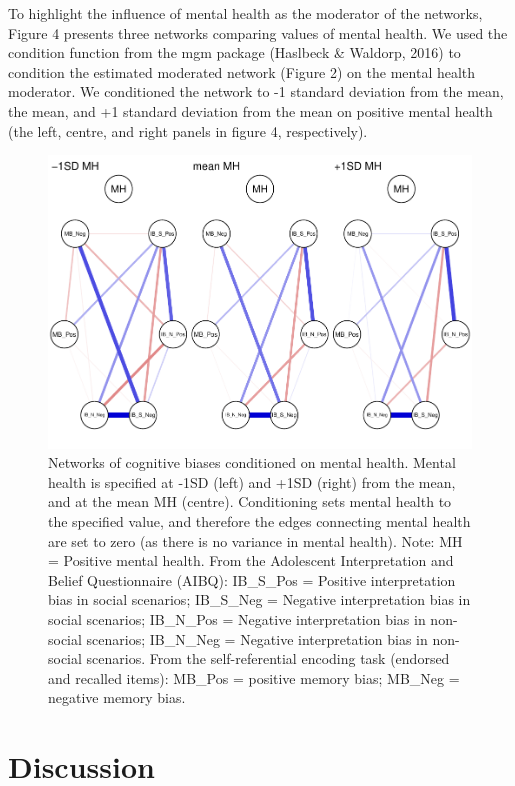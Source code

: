 \documentclass[man,floatsintext]{apa6}
\begin{document}
To highlight the influence of mental health as the moderator of the networks, Figure 4 presents three networks comparing values of mental health. We used the condition function from the mgm package (Haslbeck \& Waldorp, 2016) to condition the estimated moderated network (Figure 2) on the mental health moderator. We conditioned the network to -1 standard deviation from the mean, the mean, and +1 standard deviation from the mean on positive mental health (the left, centre, and right panels in figure 4, respectively).

\begin{figure}
\centering
\includegraphics{script_files/figure-latex/unnamed-chunk-5-1.pdf}
\caption{\label{fig:unnamed-chunk-5}Networks of cognitive biases conditioned on mental health. Mental health is specified at -1SD (left) and +1SD (right) from the mean, and at the mean MH (centre). Conditioning sets mental health to the specified value, and therefore the edges connecting mental health are set to zero (as there is no variance in mental health).
Note: MH = Positive mental health. From the Adolescent Interpretation and Belief Questionnaire (AIBQ): IB\_S\_Pos = Positive interpretation bias in social scenarios; IB\_S\_Neg = Negative interpretation bias in social scenarios; IB\_N\_Pos = Negative interpretation bias in non-social scenarios; IB\_N\_Neg = Negative interpretation bias in non-social scenarios. From the self-referential encoding task (endorsed and recalled items): MB\_Pos = positive memory bias; MB\_Neg = negative memory bias.}
\end{figure}

\hypertarget{discussion}{%
\section{Discussion}\label{discussion}}
\end{document}
